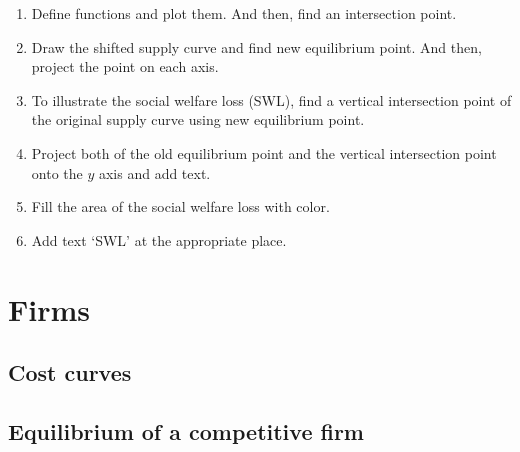 \begin{enumerate}\addtocounter{enumi}{1}\renewcommand{\labelenumi}{{Step} \theenumi{:}}\firmlist
\item Define functions and plot them. And then, find an intersection point.
\item Draw the shifted supply curve and find new equilibrium point. And then, project the point on each axis.
\item To illustrate the social welfare loss (SWL), find a vertical intersection point of the original supply curve using new equilibrium point.
\item Project both of the old equilibrium point and the vertical intersection point onto the $y$ axis and add text.
\item Fill the area of the social welfare loss with color.
\item Add text `SWL' at the appropriate place. 
\end{enumerate}


\section{Firms}
\label{si:firms}

\subsection{Cost curves}
\label{ssi:costcurves}

\begin{tzcode}{.3}
\end{tzcode}

\subsection{Equilibrium of a competitive firm}
\label{ssi:competitive}

\begin{tzcode}{.3}
\end{tzcode}


